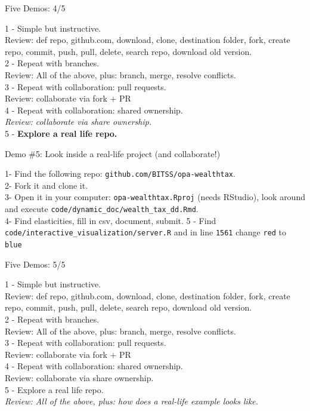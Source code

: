 \documentclass[ignorenonframetext,]{beamer}
\begin{document}
\begin{frame}{Five Demos: 4/5}
\protect\hypertarget{five-demos-45-1}{}

1 - Simple but instructive.\\
Review: def repo, github.com, download, clone, destination folder, fork,
create repo, commit, push, pull, delete, search repo, download old
version.\\
2 - Repeat with branches.\\
Review: All of the above, plus: branch, merge, resolve conflicts.\\
3 - Repeat with collaboration: pull requests.\\
Review: collaborate via fork + PR\\
4 - Repeat with collaboration: shared ownership.\\
\emph{Review: collaborate via share ownership.}\\
5 - \textbf{Explore a real life repo. }

\end{frame}

\begin{frame}[fragile]{Demo \#5: Look inside a real-life project (and
collaborate!)}
\protect\hypertarget{demo-5-look-inside-a-real-life-project-and-collaborate}{}

1- Find the following repo: \texttt{github.com/BITSS/opa-wealthtax}.\\
2- Fork it and clone it.\\
3- Open it in your computer: \texttt{opa-wealthtax.Rproj} (needs
RStudio), look around and execute
\texttt{code/dynamic\_doc/wealth\_tax\_dd.Rmd}.\\
4- Find elasticities, fill in csv, document, submit. 5 - Find
\texttt{code/interactive\_visualization/server.R} and in line
\texttt{1561} change \texttt{red} to \texttt{blue}

\end{frame}

\begin{frame}{Five Demos: 5/5}
\protect\hypertarget{five-demos-55}{}

1 - Simple but instructive.\\
Review: def repo, github.com, download, clone, destination folder, fork,
create repo, commit, push, pull, delete, search repo, download old
version.\\
2 - Repeat with branches.\\
Review: All of the above, plus: branch, merge, resolve conflicts.\\
3 - Repeat with collaboration: pull requests.\\
Review: collaborate via fork + PR\\
4 - Repeat with collaboration: shared ownership.\\
Review: collaborate via share ownership.\\
5 - Explore a real life repo.\\
\emph{Review: All of the above, plus: how does a real-life example looks
like.}

\end{frame}
\end{document}
